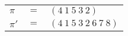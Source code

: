 \begin{example}\label{example:BYQQHUAS}
  \hfill
  \begin{\position}
    \begin{tabular}{lll}
      $\pi$  & $=$ & $(4~1~5~3~2)$ \\
      $\pi'$ & $=$ & $(4~1~5~3~2~6~7~8)$ \\
    \end{tabular}
  \end{\position}
\end{example}